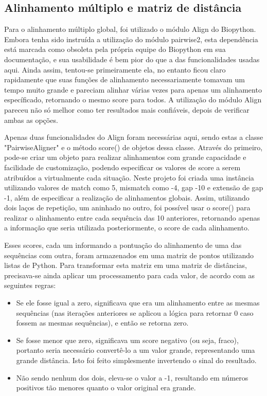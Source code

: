 \documentclass[brazilian,12pt,a4paper,final]{article}
\begin{document}
	\subsection{Alinhamento múltiplo e matriz de distância}
	
	Para o alinhamento múltiplo global, foi utilizado o módulo Align do Biopython. Embora tenha sido instruída a utilização do módulo pairwise2, esta dependência está marcada como obsoleta pela própria equipe do Biopython em sua documentação, e sua usabilidade é bem pior do que a das funcionalidades usadas aqui. Ainda assim, tentou-se primeiramente ela, no entanto ficou claro rapidamente que suas funções de alinhamento  necessariamente tomavam um tempo muito grande e pareciam alinhar várias vezes para apenas um alinhamento específicado, retornando o mesmo score para todos. A utilização do módulo Align pareceu não só melhor como ter resultados mais confiáveis, depois de verificar ambas as opções.
	\vspace{0.5cm}
	
	Apenas duas funcionalidades do Align foram necessárias aqui, sendo estas a classe "PairwiseAligner" e o método score() de objetos dessa classe. Através do primeiro, pode-se criar um objeto para realizar alinhamentos com grande capacidade e facilidade de customização, podendo especificar os valores de score a serem atribuídos a virtualmente cada situação. Neste projeto foi criada uma instância utilizando valores de match como 5, mismatch como -4, gap -10 e extensão de gap -1, além de especificar a realização de alinhamentos globais. Assim, utilizando dois laços de repetição, um aninhado no outro, foi possível usar o score() para realizar o alinhamento entre cada sequência das 10 anteriores, retornando apenas a informação que seria utilizada posteriormente, o score de cada alinhamento. 	
	\vspace{0.5cm}
	
	Esses scores, cada um informando a pontuação do alinhamento de uma das sequências com outra, foram armazenados em uma matriz de pontos utilizando listas de Python. Para transformar esta matriz em uma matriz de distâncias, precisava-se ainda aplicar um processamento para cada valor, de acordo com as seguintes regras: 
	\begin{itemize}
		\item Se ele fosse igual a zero, significava que era um alinhamento entre as mesmas sequências (nas iterações anteriores se aplicou a lógica para retornar 0 caso fossem as mesmas sequências), e então se retorna zero. 
		\item Se fosse menor que zero, significava um score negativo (ou seja, fraco), portanto seria necessário convertê-lo a um valor grande, representando uma grande distância. Isto foi feito simplesmente invertendo o sinal do resultado.
		\item Não sendo nenhum dos dois, eleva-se o valor a -1, resultando em números positivos tão menores quanto o valor original era grande.
	\end{itemize}
	\vspace{0.5cm}
	
\end{document}
